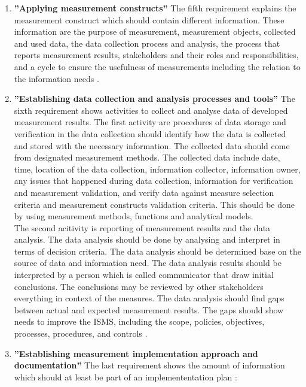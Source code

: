 \begin{enumerate}[label=(\alph*)]
  \item \label{itm:e} \textbf{''Applying measurement constructs''}
  The fifth requirement explains the measurement construct which should contain different information. These information are the purpose of measurement, measurement objects, collected and used data, the data collection process and analysis, the process that reports measurement results, stakeholders and their roles and responsibilities, and a cycle to ensure the usefulness of measurements including the relation to the information needs \cite{ISO_27004_2009}. \\

  \item \label{itm:f} \textbf{''Establishing data collection and analysis processes and tools''}
  The sixth requirement shows activities to collect and analyse data of developed measurement results. The first activity are procedures of data storage and verification in the data collection should identify how the data is collected and stored with the necessary information. The collected data should come from designated measurement methods. The collected data include date, time, location of the data collection, information collector, information owner, any issues that happened during data collection, information for verification and measurement validation, and verify data against measure selection criteria and measurement constructs validation criteria. This should be done by using measurement methods, functions and analytical models.\\ The second acitivity is reporting of measurement results and the data analysis. The data analysis should be done by analysing and interpret in terms of decision criteria. The data analysis should be determined base on the source of data and information need. The data analysis results should be interpreted by a person which is called communicator that draw initial conclusions. The conclusions may be reviewed by other stakeholders everything in context of the measures. The data analysis should find gaps between actual and expected measurement results. The gaps should show needs to improve the ISMS, including the scope, policies, objectives, processes, procedures, and controls \cite{ISO_27004_2009}.\\

  \item \label{itm:g} \textbf{''Establishing measurement implementation approach and documentation''}
  The last requirement shows the amount of information which should at least be part of an implemententation plan \cite{ISO_27004_2009}:


\end{enumerate}
